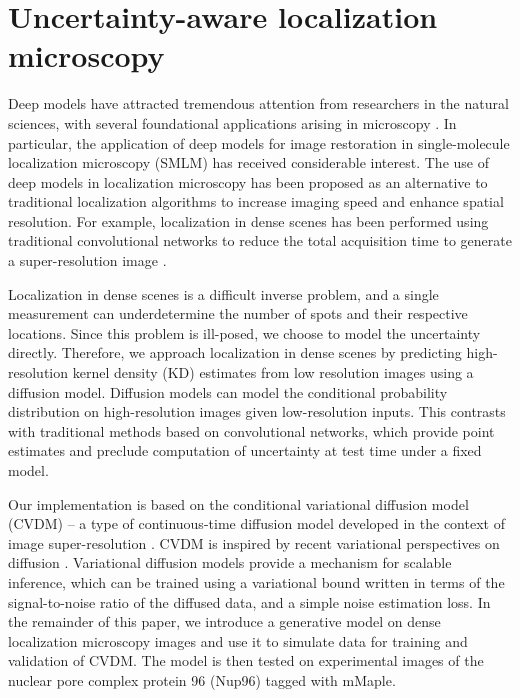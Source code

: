 
\section{Uncertainty-aware localization microscopy}

Deep models have attracted tremendous attention from researchers in the natural sciences, with several foundational applications arising in microscopy \parencite{Weigert2018,Falk2019}. In particular, the application of deep models for image restoration in single-molecule localization microscopy (SMLM) has received considerable interest. The use of deep models in localization microscopy has been proposed as an alternative to traditional localization algorithms to increase imaging speed and enhance spatial resolution. For example, localization in dense scenes has been performed using traditional convolutional networks to reduce the total acquisition time to generate a super-resolution image \parencite{Nehme2020,Speiser2021}.

Localization in dense scenes is a difficult inverse problem, and a single measurement can underdetermine the number of spots and their respective locations. Since this problem is ill-posed, we choose to model the uncertainty directly. Therefore, we approach localization in dense scenes by predicting high-resolution kernel density (KD) estimates from low resolution images using a diffusion model. Diffusion models can model the conditional probability distribution on high-resolution images given low-resolution inputs. This contrasts with traditional methods based on convolutional networks, which provide point estimates and preclude computation of uncertainty at test time under a fixed model. 

Our implementation is based on the conditional variational diffusion model (CVDM) – a type of continuous-time diffusion model developed in the context of image super-resolution \parencite{Maggiora2023}. CVDM is inspired by recent variational perspectives on diffusion \parencite{Dirmeier2023,Ribeiro2024,Kingma2021,Kingma2023}. Variational diffusion models provide a mechanism for scalable inference, which can be trained using a variational bound written in terms of the signal-to-noise ratio of the diffused data, and a simple noise estimation loss. In the remainder of this paper, we introduce a generative model on dense localization microscopy images and use it to simulate data for training and validation of CVDM. The model is then tested on experimental images of the nuclear pore complex protein 96 (Nup96) tagged with mMaple. 

